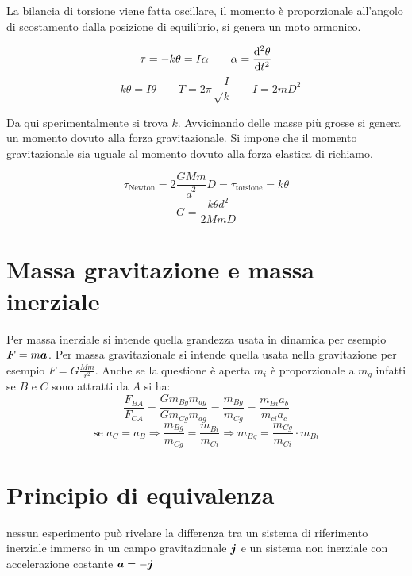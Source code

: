 La bilancia di torsione viene fatta oscillare, il momento è
proporzionale all'angolo di scostamento dalla posizione di
equilibrio, si genera un moto armonico.

\begin{equation*}\tau=-k\theta=I\alpha\qquad\alpha=\frac{\mathrm{d}^2\theta}{\mathrm{d} t^2}\end{equation*}
\begin{equation*}-k\theta=I\ddot\theta\qquad T=2\pi\sqrt\frac{I}{k}\qquad I=2mD^2\end{equation*}


Da qui sperimentalmente si trova $k$. Avvicinando delle masse più
grosse si genera un momento dovuto alla forza gravitazionale. Si
impone che il momento gravitazionale sia uguale al momento dovuto
alla forza elastica di richiamo.

\begin{equation*}\tau_\text{Newton}=2\frac{GMm}{d^2}D=\tau_\text{torsione}=k\theta\end{equation*}
\begin{equation*}G=\frac{k\theta d^2}{2MmD}\end{equation*}
\section{Massa gravitazione e massa inerziale}
Per massa inerziale si intende quella grandezza usata in dinamica
per esempio \mbox{$\boldsymbol{F}=m\boldsymbol{a}$}. Per massa gravitazionale si intende quella usata nella gravitazione per esempio $F=G\frac{Mm}{r^2}$. Anche se la questione è aperta $m_i$ è proporzionale a $m_g$ infatti se $B$ e $C$ sono attratti da $A$ si ha:
\begin{equation*}\frac{F_{BA}}{F_{CA}}=\frac{Gm_{Bg}m_{ag}}{Gm_{Cg}m_{ag}}=\frac{m_{Bg}}{m_{Cg}}=\frac{m_{Bi}a_b}{m_{ci}a_c}\end{equation*}
\[\text{se }a_C=a_B\Rightarrow\frac{m_{Bg}}{m_{Cg}}=\frac{m_{Bi}}{m_{Ci}}\Rightarrow
m_{Bg}=\frac{m_{Cg}}{m_{Ci}}\cdot m_{Bi}\]
\section{Principio di equivalenza}
\begin{Pri}
nessun esperimento può rivelare la differenza tra un sistema di riferimento inerziale immerso in un campo gravitazionale $\boldsymbol{j}$ e un sistema non inerziale con accelerazione costante $\boldsymbol{a}=-\boldsymbol{j}$
\end{Pri}
